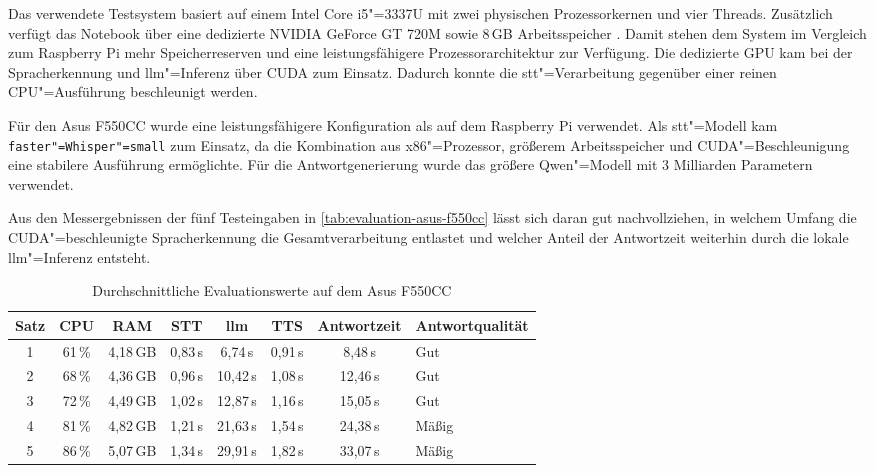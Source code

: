 Das verwendete Testsystem basiert auf einem Intel Core i5"=3337U mit zwei physischen Prozessorkernen und vier Threads. Zusätzlich verfügt das Notebook über eine dedizierte NVIDIA GeForce GT 720M sowie 8\,GB Arbeitsspeicher \autocite{AsusF550CC-Documentation}. Damit stehen dem System im Vergleich zum Raspberry Pi mehr Speicherreserven und eine leistungsfähigere Prozessorarchitektur zur Verfügung. Die dedizierte GPU kam  bei der Spracherkennung und \gls{llm}"=Inferenz über CUDA zum Einsatz. Dadurch konnte die \gls{stt}"=Verarbeitung gegenüber einer reinen CPU"=Ausführung beschleunigt werden.

Für den Asus F550CC wurde eine leistungsfähigere Konfiguration als auf dem Raspberry Pi verwendet. Als \gls{stt}"=Modell kam \texttt{faster"=Whisper"=small} zum Einsatz, da die Kombination aus x86"=Prozessor, größerem Arbeitsspeicher und CUDA"=Beschleunigung eine stabilere Ausführung ermöglichte. Für die Antwortgenerierung wurde das größere Qwen"=Modell mit 3 Milliarden Parametern verwendet.

Aus den Messergebnissen der fünf Testeingaben in \autoref{tab:evaluation-asus-f550cc} lässt sich daran gut nachvollziehen, in welchem Umfang die CUDA"=beschleunigte Spracherkennung die Gesamtverarbeitung entlastet und welcher Anteil der Antwortzeit weiterhin durch die lokale \gls{llm}"=Inferenz entsteht.

\begin{table}[H]
  \centering
  \caption{Durchschnittliche Evaluationswerte auf dem Asus F550CC}
  \label{tab:evaluation-asus-f550cc}
  \small
  \begin{tabular}{c c c c c c c l}
    \toprule
    \textbf{Satz}        &
    \textbf{CPU}         &
    \textbf{RAM}         &
    \textbf{STT}         &
    \textbf{\gls{llm}}   &
    \textbf{TTS}         &
    \textbf{Antwortzeit} &
    \textbf{Antwortqualität}                                                                   \\
    \midrule
    1                    & 61\,\% & 4,18\,GB & 0,83\,s & 6,74\,s  & 0,91\,s & 8,48\,s  & Gut   \\
    2                    & 68\,\% & 4,36\,GB & 0,96\,s & 10,42\,s & 1,08\,s & 12,46\,s & Gut   \\
    3                    & 72\,\% & 4,49\,GB & 1,02\,s & 12,87\,s & 1,16\,s & 15,05\,s & Gut   \\
    4                    & 81\,\% & 4,82\,GB & 1,21\,s & 21,63\,s & 1,54\,s & 24,38\,s & Mäßig \\
    5                    & 86\,\% & 5,07\,GB & 1,34\,s & 29,91\,s & 1,82\,s & 33,07\,s & Mäßig \\
    \bottomrule
  \end{tabular}
\end{table}

